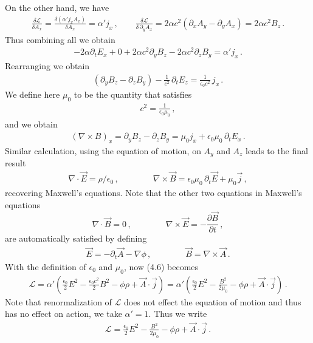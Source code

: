 \documentclass[11pt, onesided]{book}
\theoremstyle{break}
\theoremstyle{break}
\newcommand{\pd}{\partial}
\begin{document}
On the other hand, we have
\begin{align*}
\frac{\delta \mathcal{L}}{\delta A_x} = \frac{\delta (\alpha' j_x A_x)}{\delta A_x} = \alpha' j_x\,,\qquad
\frac{\delta \mathcal{L}}{\delta\, \pd_y A_x} = 2\alpha c^2(\pd_x A_y - \pd_y A_x) = 2\alpha c^2 B_z\,.
\end{align*}
Thus combining all we obtain
\begin{align*}
-2\alpha \pd_tE_x + 0 + 2\alpha c^2 \pd_y B_z - 2\alpha c^2 \pd_z B_y = \alpha' j_x\,.
\end{align*}
Rearranging we obtain
\begin{align*}
(\pd_y B_z - \pd_z B_y) - \frac{1}{c^2}\, \pd_t E_z = \frac{1}{\epsilon_0 c^2}\, j_x\,.
\end{align*}
We define here $\mu_0$ to be the quantity that satisfies
\begin{align*}
c^2 = \frac{1}{\epsilon_0 \mu_0}\,,
\end{align*}
and we obtain
\begin{align*}
(\nabla \times B)_x =\pd_ y B_z- \pd_z B_y = \mu_0 j_x + \epsilon_0 \mu_0\, \pd_t E_x\,.
\end{align*}
Similar calculation, using the equation of motion, on $A_y$ and $A_z$ leads to the final result
\begin{align*}
\nabla \cdot \vec{E} = \rho/\epsilon_0\,,\qquad
\qquad \nabla \times \vec{B} = \epsilon_0 \mu_0 \,\pd_t \vec{E} + \mu_0 \vec{j}\,,
\end{align*}
recovering Maxwell's equations. Note that the other two equations in Maxwell's equations 
$$\nabla \cdot \vec{B} = 0\,,
\qquad\qquad
\nabla \times \vec{E} = -\frac{\pd \vec{B}}{\pd t}\,,
$$
are automatically satisfied by defining
\begin{align*}
\vec{E} = -\pd_t \vec{A} - \nabla \phi\,,\qquad\qquad
\vec{B} = \nabla \times \vec{A}\,.
\end{align*}
With the definition of $\epsilon_0$ and $\mu_0$, now (4.6) becomes
\begin{align*}
\mathcal{L} = \alpha'\left( \frac{\epsilon_0}{2}E^2 - \frac{\epsilon_0c^2}{2}B^2 - \phi \rho + \vec{A}\cdot \vec{j}\right) = \alpha'\left( \frac{\epsilon_0}{2}E^2 - \frac{B^2}{2\mu_0} - \phi \rho + \vec{A}\cdot \vec{j}\right)\,.
\end{align*}
Note that renormalization of $\mathcal{L}$ does not effect the equation of motion and thus has no effect on action, we take $\alpha' =1$. Thus we write
\begin{align*}
\mathcal{L} =   \frac{\epsilon_0}{2}E^2 - \frac{B^2}{2\mu_0} - \phi \rho + \vec{A}\cdot \vec{j}\,.
\end{align*}
\end{document}
